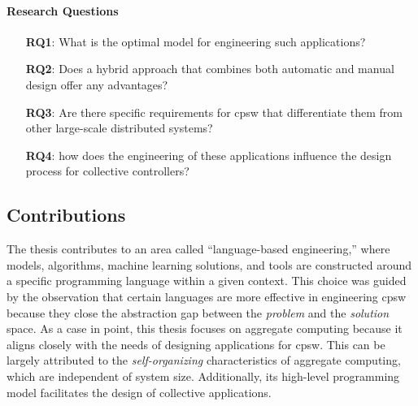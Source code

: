 \begin{refsection}
\paragraph*{Research Questions}
\begin{itemize}
    \item[\textbf{RQ1}:] What is the optimal model for engineering such applications?
    \item[\textbf{RQ2}:] Does a hybrid approach that combines both automatic and manual design offer any advantages? 
    \item[\textbf{RQ3}:] Are there specific requirements for \ac{cpsw} that differentiate them from other large-scale distributed systems?
    \item[\textbf{RQ4}:] how does the engineering of these applications influence the design process for collective controllers?
\end{itemize}

\subsection*{Contributions}

The thesis contributes to an area called ``language-based engineering,'' where models, algorithms, machine learning solutions, and tools are constructed around a specific programming language within a given context. 
This choice was guided by the observation that certain languages are more effective in engineering \ac{cpsw} because they close the abstraction gap between the \emph{problem} and the \emph{solution} space.
As a case in point, this thesis focuses on aggregate computing because it aligns closely with the needs of designing applications for \acf{cpsw}. 
This can be largely attributed to the \emph{self-organizing} characteristics of aggregate computing, which are independent of system size. Additionally, its high-level programming model facilitates the design of collective applications.


\end{refsection}

